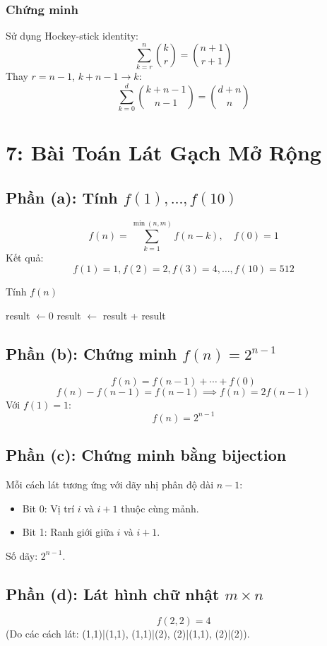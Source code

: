 \documentclass[a4paper,12pt]{article}
\theoremstyle{plain}
\theoremstyle{definition}
\begin{document}
\subsubsection*{Chứng minh}
Sử dụng Hockey-stick identity:
\[
\sum_{k=r}^n \binom{k}{r} = \binom{n+1}{r+1}
\]
Thay \( r = n-1 \), \( k+n-1 \to k \):
\[
\sum_{k=0}^d \binom{k+n-1}{n-1} = \binom{d+n}{n}
\]

\section*{7: Bài Toán Lát Gạch Mở Rộng}

\subsection*{Phần (a): Tính \( f(1), \ldots, f(10) \)}
\[
f(n) = \sum_{k=1}^{\min(n,m)} f(n-k), \quad f(0) = 1
\]
Kết quả:
\[
f(1)=1, f(2)=2, f(3)=4, \ldots, f(10)=512
\]

\begin{algorithm}
\caption{Tính \( f(n) \)}
\begin{algorithmic}
     
    \EndIf
    \State result $\gets 0$
        \State result $\gets$ result + 
    \EndFor
    \State \Return result
\EndFunction
\end{algorithmic}
\end{algorithm}

\subsection*{Phần (b): Chứng minh \( f(n) = 2^{n-1} \)}
\[
f(n) = f(n-1) + \cdots + f(0)
\]
\[
f(n) - f(n-1) = f(n-1) \implies f(n) = 2f(n-1)
\]
Với \( f(1) = 1 \):
\[
f(n) = 2^{n-1}
\]

\subsection*{Phần (c): Chứng minh bằng bijection}
Mỗi cách lát tương ứng với dãy nhị phân độ dài \( n-1 \):
\begin{itemize}
    \item Bit 0: Vị trí \( i \) và \( i+1 \) thuộc cùng mảnh.
    \item Bit 1: Ranh giới giữa \( i \) và \( i+1 \).
\end{itemize}
Số dãy: \( 2^{n-1} \).

\subsection*{Phần (d): Lát hình chữ nhật \( m \times n \)}
\[
f(2,2) = 4
\]
(Do các cách lát: (1,1)|(1,1), (1,1)|(2), (2)|(1,1), (2)|(2)).
\end{document}
